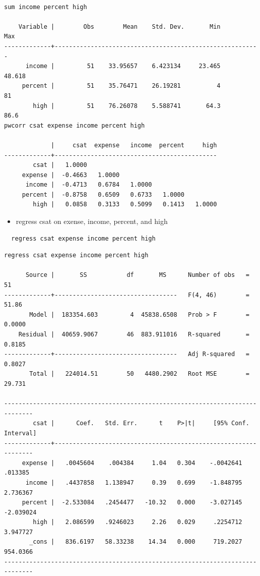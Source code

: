 \documentclass[]{book}
\providecommand{\tightlist}{%
  \setlength{\itemsep}{0pt}\setlength{\parskip}{0pt}}
\begin{document}
\begin{verbatim}

sum income percent high

    Variable |        Obs        Mean    Std. Dev.       Min        Max
-------------+---------------------------------------------------------
      income |         51    33.95657    6.423134     23.465     48.618
     percent |         51    35.76471    26.19281          4         81
        high |         51    76.26078    5.588741       64.3       86.6
pwcorr csat expense income percent high

             |     csat  expense   income  percent     high
-------------+---------------------------------------------
        csat |   1.0000 
     expense |  -0.4663   1.0000 
      income |  -0.4713   0.6784   1.0000 
     percent |  -0.8758   0.6509   0.6733   1.0000 
        high |   0.0858   0.3133   0.5099   0.1413   1.0000
\end{verbatim}

\begin{itemize}
\tightlist
\item
  regress csat on exense, income, percent, and high
\end{itemize}

\begin{verbatim}
  regress csat expense income percent high
\end{verbatim}

\begin{verbatim}
regress csat expense income percent high

      Source |       SS           df       MS      Number of obs   =        51
-------------+----------------------------------   F(4, 46)        =     51.86
       Model |  183354.603         4  45838.6508   Prob > F        =    0.0000
    Residual |  40659.9067        46  883.911016   R-squared       =    0.8185
-------------+----------------------------------   Adj R-squared   =    0.8027
       Total |   224014.51        50   4480.2902   Root MSE        =    29.731

------------------------------------------------------------------------------
        csat |      Coef.   Std. Err.      t    P>|t|     [95% Conf. Interval]
-------------+----------------------------------------------------------------
     expense |   .0045604    .004384     1.04   0.304    -.0042641     .013385
      income |   .4437858   1.138947     0.39   0.699    -1.848795    2.736367
     percent |  -2.533084   .2454477   -10.32   0.000    -3.027145   -2.039024
        high |   2.086599   .9246023     2.26   0.029     .2254712    3.947727
       _cons |   836.6197   58.33238    14.34   0.000     719.2027    954.0366
------------------------------------------------------------------------------
\end{verbatim}
\end{document}
